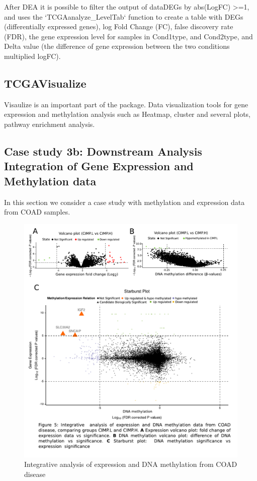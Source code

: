 After DEA it is possible to filter the output of dataDEGs by abs(LogFC) >=1, and uses the `TCGAanalyze\_LevelTab` function to create a table with DEGs (differentially expressed genes), log Fold Change (FC), false discovery rate (FDR), the gene expression level for samples in Cond1type, and Cond2type, and Delta value (the difference of gene expression between the two conditions multiplied logFC).

\subsection{TCGAVisualize}
Visaulize is an important part of the package.
Data visualization tools for gene expression and methylation analysis such as Heatmap, cluster and several plots, pathway enrichment analysis.

\subsection{Case study 3b: Downstream Analysis Integration of Gene Expression and Methylation data}


In this section we consider a case study with methylation and expression data from COAD samples. 


\begin{figure}
\centering
\includegraphics[width=.9\linewidth]{images/case3_improved2.pdf}

\caption{Integrative analysis of expression and DNA methylation from COAD disease}
\label{fig:workflow}
\end{figure}

